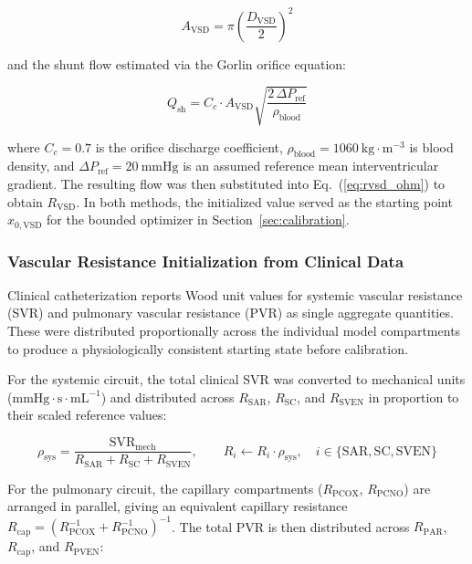 \documentclass{article}
\begin{document}
\begin{equation}
    A_\mathrm{VSD} = \pi \left(\frac{D_\mathrm{VSD}}{2}\right)^2
    \label{eq:vsd_area}
\end{equation}

\noindent and the shunt flow estimated via the Gorlin orifice
equation:

\begin{equation}
    Q_\mathrm{sh}
    = C_c \cdot A_\mathrm{VSD}
      \sqrt{\frac{2\,\Delta P_\mathrm{ref}}{\rho_\mathrm{blood}}}
    \label{eq:gorlin}
\end{equation}

\noindent where $C_c = 0.7$ is the orifice discharge coefficient,
$\rho_\mathrm{blood} = 1060\ \mathrm{kg{\cdot}m^{-3}}$ is blood
density, and $\Delta P_\mathrm{ref} = 20\ \mathrm{mmHg}$ is an
assumed reference mean interventricular gradient. The resulting
flow was then substituted into Eq.~(\ref{eq:rvsd_ohm}) to obtain
$R_\mathrm{VSD}$. In both methods, the initialized value served
as the starting point $x_{0,\mathrm{VSD}}$ for the bounded
optimizer in Section~\ref{sec:calibration}.

\subsubsection{Vascular Resistance Initialization from Clinical Data}
\label{sec:svr_pvr_init}

Clinical catheterization reports Wood unit values for systemic
vascular resistance (SVR) and pulmonary vascular resistance (PVR)
as single aggregate quantities. These were distributed
proportionally across the individual model compartments to produce
a physiologically consistent starting state before calibration.

For the systemic circuit, the total clinical SVR was converted to
mechanical units ($\mathrm{mmHg{\cdot}s{\cdot}mL^{-1}}$) and
distributed across $R_\mathrm{SAR}$, $R_\mathrm{SC}$, and
$R_\mathrm{SVEN}$ in proportion to their scaled reference values:

\begin{equation}
    \rho_\mathrm{sys}
    = \frac{\mathrm{SVR}_\mathrm{mech}}
           {R_\mathrm{SAR} + R_\mathrm{SC} + R_\mathrm{SVEN}},
    \qquad
    R_i \leftarrow R_i \cdot \rho_\mathrm{sys},
    \quad i \in \{\mathrm{SAR, SC, SVEN}\}
    \label{eq:svr_dist}
\end{equation}

For the pulmonary circuit, the capillary compartments
($R_\mathrm{PCOX}$, $R_\mathrm{PCNO}$) are arranged in parallel,
giving an equivalent capillary resistance
$R_\mathrm{cap} = (R_\mathrm{PCOX}^{-1} + R_\mathrm{PCNO}^{-1})^{-1}$.
The total PVR is then distributed across $R_\mathrm{PAR}$,
$R_\mathrm{cap}$, and $R_\mathrm{PVEN}$:
\end{document}
